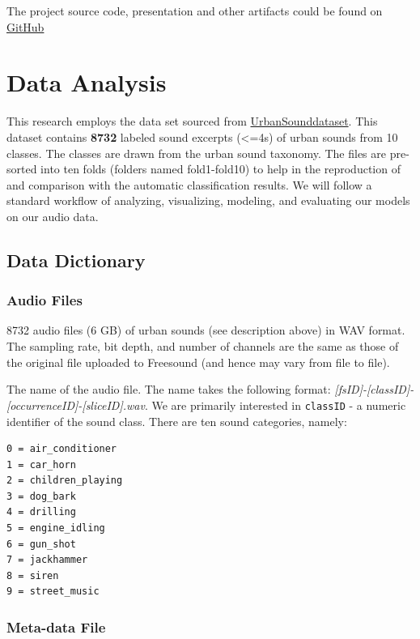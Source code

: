 The project source code, presentation and other artifacts could be found
on \href{https://github.com/v2msLabs/ML1020-Course-Project}{GitHub}

\hypertarget{data-analysis}{%
\section{Data Analysis}\label{data-analysis}}

This research employs the data set sourced from
\href{https://urbansounddataset.weebly.com/urbansound8k.html}{UrbanSounddataset}.
This dataset contains \textbf{8732} labeled sound excerpts
(\textless{}=4s) of urban sounds from 10 classes. The classes are drawn
from the urban sound taxonomy. The files are pre-sorted into ten folds
(folders named fold1-fold10) to help in the reproduction of and
comparison with the automatic classification results. We will follow a
standard workflow of analyzing, visualizing, modeling, and evaluating
our models on our audio data.

\hypertarget{data-dictionary}{%
\subsection{Data Dictionary}\label{data-dictionary}}

\hypertarget{audio-files}{%
\subsubsection{Audio Files}\label{audio-files}}

8732 audio files (6 GB) of urban sounds (see description above) in WAV
format. The sampling rate, bit depth, and number of channels are the
same as those of the original file uploaded to Freesound (and hence may
vary from file to file).

The name of the audio file. The name takes the following format:
\emph{{[}fsID{]}-{[}classID{]}-{[}occurrenceID{]}-{[}sliceID{]}.wav}. We
are primarily interested in \texttt{classID} - a numeric identifier of
the sound class. There are ten sound categories, namely:

\begin{verbatim}
0 = air_conditioner
1 = car_horn
2 = children_playing
3 = dog_bark
4 = drilling
5 = engine_idling
6 = gun_shot
7 = jackhammer
8 = siren
9 = street_music
\end{verbatim}

\hypertarget{meta-data-file}{%
\subsubsection{Meta-data File}\label{meta-data-file}}

